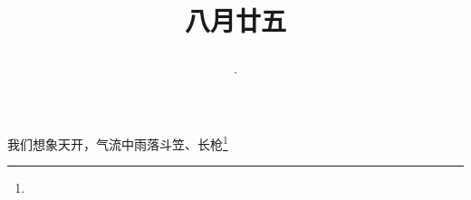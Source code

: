 \title{\date[d=27,m=9,y=2024][year:cn-y,年,month:cn,day:cn,日,·,weekday]·八月廿五 }
我们想象天开，气流中雨落斗笠、长枪\footnote{ }

